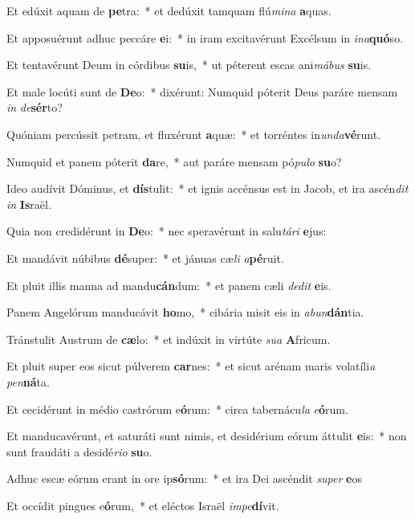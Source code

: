 \item Et edúxit aquam de \textbf{pe}tra:~* et dedúxit tamquam flú\textit{mi}\textit{na} \textbf{a}quas.
\item Et apposuérunt adhuc peccáre \textbf{e}i:~* in iram excitavérunt Excélsum in \textit{in}\textit{a}\textbf{quó}so.
\item Et tentavérunt Deum in córdibus \textbf{su}is,~* ut péterent escas ani\textit{má}\textit{bus} \textbf{su}is.
\item Et male locúti sunt de \textbf{De}o:~* dixérunt: Numquid póterit Deus paráre mensam \textit{in} \textit{de}\textbf{sér}to?
\item Quóniam percússit petram, et fluxérunt \textbf{a}quæ:~* et torréntes in\textit{un}\textit{da}\textbf{vé}runt.
\item Numquid et panem póterit \textbf{da}re,~* aut paráre mensam pó\textit{pu}\textit{lo} \textbf{su}o?
\item Ideo audívit Dóminus, et \textbf{dís}tulit:~* et ignis accénsus est in Jacob, et ira ascén\textit{dit} \textit{in} \textbf{Is}raël.
\item Quia non credidérunt in \textbf{De}o:~* nec speravérunt in salu\textit{tá}\textit{ri} \textbf{e}jus:
\item Et mandávit núbibus \textbf{dé}super:~* et jánuas cæ\textit{li} \textit{a}\textbf{pé}ruit.
\item Et pluit illis manna ad mandu\textbf{cán}dum:~* et panem cæli \textit{de}\textit{dit} \textbf{e}is.
\item Panem Angelórum manducávit \textbf{ho}mo,~* cibária misit eis in \textit{ab}\textit{un}\textbf{dán}tia.
\item Tránstulit Austrum de \textbf{cæ}lo:~* et indúxit in virtúte \textit{su}\textit{a} \textbf{A}fricum.
\item Et pluit super eos sicut púlverem \textbf{car}nes:~* et sicut arénam maris volatíli\textit{a} \textit{pen}\textbf{ná}ta.
\item Et cecidérunt in médio castrórum e\textbf{ó}rum:~* circa tabernácu\textit{la} \textit{e}\textbf{ó}rum.
\item Et manducavérunt, et saturáti sunt nimis, et desidérium eórum áttulit \textbf{e}is:~* non sunt fraudáti a desidé\textit{ri}\textit{o} \textbf{su}o.
\item Adhuc escæ eórum erant in ore ip\textbf{só}rum:~* et ira Dei ascéndit \textit{su}\textit{per} \textbf{e}os
\item Et occídit pingues e\textbf{ó}rum,~* et eléctos Israël \textit{im}\textit{pe}\textbf{dí}vit.
